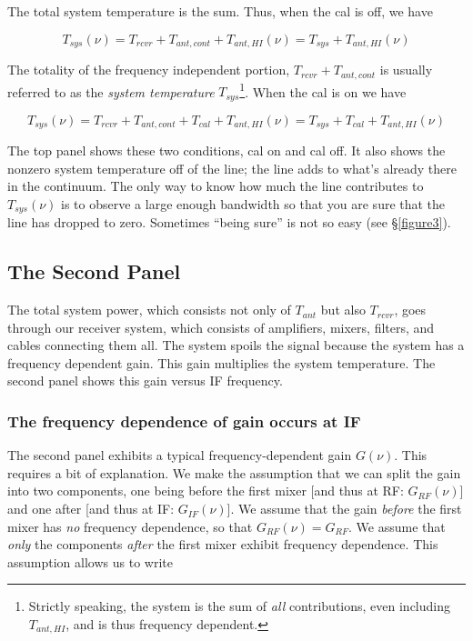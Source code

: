 \documentclass[preprint]{aastex}
\begin{document}
	The total system temperature is the sum. Thus, when the cal is
off, we have

\begin{mathletters}
\begin{equation} \label{tsyscalon}
T_{sys}(\nu) = T_{rcvr} + T_{ant, cont} + T_{ant, HI}(\nu) = 
	T_{sys}  + T_{ant, HI}(\nu) 
\end{equation}

\noindent The totality of the frequency independent portion, $T_{rcvr} +
T_{ant,cont}$ is usually referred to as the {\it system temperature}
$T_{sys}$\footnote{Strictly speaking, the system is the sum of {\it all}
contributions, even including $T_{ant,HI}$, and is thus frequency
dependent.}. When the cal is on we have

\begin{equation} \label{tsyscaloff}
T_{sys}(\nu) = T_{rcvr} + T_{ant, cont} + T_{cal} + T_{ant, HI}(\nu) = 
	T_{sys}  + T_{cal} + T_{ant, HI}(\nu) 
\end{equation}
\end{mathletters}

	The top panel shows these two conditions, cal on and cal off. It
also shows the nonzero system temperature off of the line; the line adds
to what's already there in the continuum. The only way to know how much
the line contributes to $T_{sys}(\nu)$ is to observe a large enough
bandwidth so that you are sure that the line has dropped to zero.
Sometimes ``being sure'' is not so easy (see \S \ref{figure3}).

\subsection{The Second Panel}

	The total system power, which consists not only of $T_{ant}$ but
also $T_{rcvr}$, goes through our receiver system, which consists of
amplifiers, mixers, filters, and cables connecting them all. The system
spoils the signal because the system has a frequency dependent gain.
This gain multiplies the system temperature. The second panel shows this
gain versus IF frequency.

\subsubsection{ The frequency dependence of gain occurs at IF}

	The second panel exhibits a typical frequency-dependent gain
$G(\nu)$. This requires a bit of explanation. We make the assumption
that we can split the gain into two components, one being before the
first mixer [and thus at RF: $G_{RF}(\nu)$] and one after [and thus at
IF: $G_{IF}(\nu)$]. We assume that the gain {\it before} the first mixer
has {\it no} frequency dependence, so that $G_{RF}(\nu) = G_{RF}$. We
assume that {\it only} the components {\it after} the first mixer
exhibit frequency dependence. This assumption allows us to write 
\end{document}
